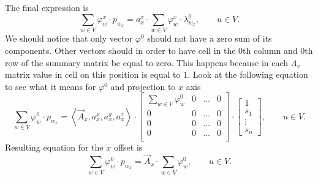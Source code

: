 The final expression is
\begin{equation*}
  \sum\limits_{w \in V} \varphi_w^x \cdot p_{w_x}
  = a_x^x \cdot \sum\limits_{w \in V} \varphi_w^x \cdot \lambda^0_{w_x},
  \qquad u \in V.
\end{equation*}
We should notice that only vector $\varphi^0$
should not have a zero sum of its components.
Other vectors should in order to have cell in the $0$th column and $0$th row
of the summary matrix be equal to zero.
This happens because in each $\Lambda_v$ matrix value in cell on this position
is equal to $1$.
Look at the following equation to see what it means for $\varphi^0$
and projection to $x$ axis
\begin{equation*}
  \sum\limits_{w \in V} \varphi_w^0 \cdot p_{w_x}
  = \left\langle \vec{A}_x, a_x^x, a_x^y, a_x^z \right\rangle
    \cdot \begin{bmatrix}
      \sum\limits_{w \in V} \varphi_w^0 & 0 & \dots & 0 \\
      0                                 & 0 & \dots   & 0 \\
      0                                 & 0 & \dots & 0 \\
      0                                 & 0 & \dots & 0 \\
    \end{bmatrix}
    \cdot \begin{bmatrix}
      1 \\
      s_1 \\
      \vdots \\
      s_n
    \end{bmatrix},
  \qquad u \in V.
\end{equation*}
Resulting equation for the $x$ offset is
\begin{equation*}
  \sum\limits_{w \in V} \varphi_w^0 \cdot p_{w_x}
  = \vec{A}_x \cdot \sum\limits_{w \in V} \varphi_w^0,
  \qquad u \in V.
\end{equation*}

